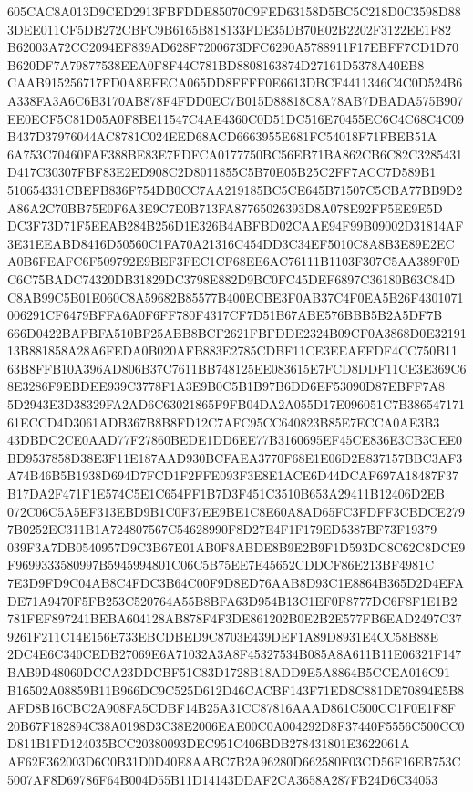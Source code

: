 \documentclass[UTF8,fontset=fandol,zihao=-4,a4paper]{ctexart}
\begin{document}
{{605CAC8A013D9CED2913FBFDDE85070C9FED63158D5BC5C218D0C3598D883DEE011CF5DB272CBFC9B6165B818133FDE35DB70E02B2202F3122EE1F82
B62003A72CC2094EF839AD628F7200673DFC6290A5788911F17EBFF7CD1D70B620DF7A79877538EEA0F8F44C781BD8808163874D27161D5378A40EB8
CAAB915256717FD0A8EFECA065DD8FFFF0E6613DBCF4411346C4C0D524B6A338FA3A6C6B3170AB878F4FDD0EC7B015D88818C8A78AB7DBADA575B907
EE0ECF5C81D05A0F8BE11547C4AE4360C0D51DC516E70455EC6C4C68C4C09B437D37976044AC8781C024EED68ACD6663955E681FC54018F71FBEB51A
6A753C70460FAF388BE83E7FDFCA0177750BC56EB71BA862CB6C82C3285431D417C30307FBF83E2ED908C2D8011855C5B70E05B25C2FF7ACC7D589B1
510654331CBEFB836F754DB0CC7AA219185BC5CE645B71507C5CBA77BB9D2A86A2C70BB75E0F6A3E9C7E0B713FA87765026393D8A078E92FF5EE9E5D
DC3F73D71F5EEAB284B256D1E326B4ABFBD02CAAE94F99B09002D31814AF3E31EEABD8416D50560C1FA70A21316C454DD3C34EF5010C8A8B3E89E2EC
A0B6FEAFC6F509792E9BEF3FEC1CF68EE6AC76111B1103F307C5AA389F0DC6C75BADC74320DB31829DC3798E882D9BC0FC45DEF6897C36180B63C84D
C8AB99C5B01E060C8A59682B85577B400ECBE3F0AB37C4F0EA5B26F4301071006291CF6479BFFA6A0F6FF780F4317CF7D51B67ABE576BBB5B2A5DF7B
666D0422BAFBFA510BF25ABB8BCF2621FBFDDE2324B09CF0A3868D0E3219113B881858A28A6FEDA0B020AFB883E2785CDBF11CE3EEAEFDF4CC750B11
63B8FFB10A396AD806B37C7611BB748125EE083615E7FCD8DDF11CE3E369C68E3286F9EBDEE939C3778F1A3E9B0C5B1B97B6DD6EF53090D87EBFF7A8
5D2943E3D38329FA2AD6C63021865F9FB04DA2A055D17E096051C7B38654717161ECCD4D3061ADB367B8B8FD12C7AFC95CC640823B85E7ECCA0AE3B3
43DBDC2CE0AAD77F27860BEDE1DD6EE77B3160695EF45CE836E3CB3CEE0BD9537858D38E3F11E187AAD930BCFAEA3770F68E1E06D2E837157BBC3AF3
A74B46B5B1938D694D7FCD1F2FFE093F3E8E1ACE6D44DCAF697A18487F37B17DA2F471F1E574C5E1C654FF1B7D3F451C3510B653A29411B12406D2EB
072C06C5A5EF313EBD9B1C0F37EE9BE1C8E60A8AD65FC3FDFF3CBDCE2797B0252EC311B1A724807567C54628990F8D27E4F1F179ED5387BF73F19379
039F3A7DB0540957D9C3B67E01AB0F8ABDE8B9E2B9F1D593DC8C62C8DCE9F9699333580997B5945994801C06C5B75EE7E45652CDDCF86E213BF4981C
7E3D9FD9C04AB8C4FDC3B64C00F9D8ED76AAB8D93C1E8864B365D2D4EFADE71A9470F5FB253C520764A55B8BFA63D954B13C1EF0F8777DC6F8F1E1B2
781FEF897241BEBA604128AB878F4F3DE861202B0E2B2E577FB6EAD2497C379261F211C14E156E733EBCDBED9C8703E439DEF1A89D8931E4CC58B88E
2DC4E6C340CEDB27069E6A71032A3A8F45327534B085A8A611B11E06321F147BAB9D48060DCCA23DDCBF51C83D1728B18ADD9E5A8864B5CCEA016C91
B16502A08859B11B966DC9C525D612D46CACBF143F71ED8C881DE70894E5B8AFD8B16CBC2A908FA5CDBF14B25A31CC87816AAAD861C500CC1F0E1F8F
20B67F182894C38A0198D3C38E2006EAE00C0A004292D8F37440F5556C500CC0D811B1FD124035BCC20380093DEC951C406BDB278431801E3622061A
AF62E362003D6C0B31D0D40E8AABC7B2A96280D662580F03CD56F16EB753C5007AF8D69786F64B004D55B11D14143DDAF2CA3658A287FB24D6C34053
}}
\end{document}

